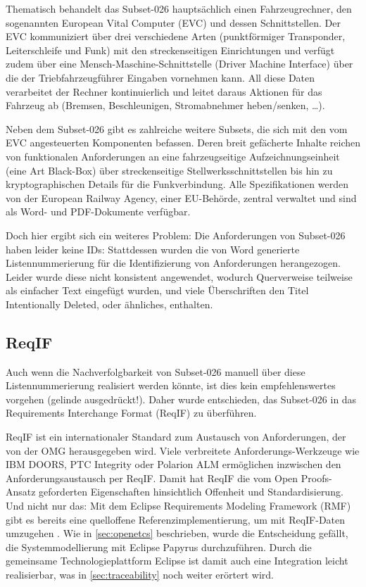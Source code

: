 \documentclass[twoside]{article}
\begin{document}
\begin{multicols}{2}
Thematisch behandelt das Subset-026 hauptsächlich einen Fahrzeugrechner, den sogenannten European Vital Computer (EVC) und dessen Schnittstellen. Der EVC kommuniziert über drei verschiedene Arten (punktförmiger Transponder, Leiterschleife und Funk) mit den streckenseitigen Einrichtungen und verfügt zudem über eine Mensch-Maschine-Schnittstelle (Driver Machine Interface) über die der Triebfahrzeugführer Eingaben vornehmen kann. All diese Daten verarbeitet der Rechner kontinuierlich und leitet daraus Aktionen für das Fahrzeug ab (Bremsen, Beschleunigen, Stromabnehmer heben/senken, \ldots ).

Neben dem Subset-026 gibt es zahlreiche weitere Subsets, die sich mit den vom EVC angesteuerten Komponenten befassen. Deren breit gefächerte Inhalte reichen von funktionalen Anforderungen an eine fahrzeugseitige Aufzeichnungseinheit (eine Art \glqq{}Black-Box\grqq{}) über streckenseitige Stellwerksschnittstellen bis hin zu kryptographischen Details für die Funkverbindung. Alle Spezifikationen werden von der European Railway Agency, einer EU-Behörde, zentral verwaltet und sind als Word- und PDF-Dokumente verfügbar.

Doch hier ergibt sich ein weiteres Problem: Die Anforderungen von Subset-026 haben leider keine IDs: Stattdessen wurden die von Word generierte Listennummerierung für die Identifizierung von Anforderungen herangezogen. Leider wurde diese nicht konsistent angewendet, wodurch Querverweise teilweise als einfacher Text eingefügt wurden, und viele Überschriften den Titel \glqq{}Intentionally Deleted\grqq{}, oder ähnliches, enthalten.

\subsection{ReqIF}

Auch wenn die Nachverfolgbarkeit von Subset-026 manuell über diese Listennummerierung realisiert werden könnte, ist dies kein empfehlenswertes vorgehen (gelinde ausgedrückt!).  Daher wurde entschieden, das Subset-026 in das Requirements Interchange Format (ReqIF) zu überführen. 

ReqIF \cite{openup} ist ein internationaler Standard zum Austausch von Anforderungen, der von der OMG herausgegeben wird.  Viele verbreitete Anforderungs-Werkzeuge wie IBM DOORS, PTC Integrity oder Polarion ALM ermöglichen inzwischen den Anforderungsaustausch per ReqIF.  Damit hat ReqIF die vom Open Proofs-Ansatz geforderten Eigenschaften hinsichtlich Offenheit und Standardisierung.  Und nicht nur das: Mit dem Eclipse Requirements Modeling Framework (RMF) gibt es bereits eine quelloffene Referenzimplementierung, um mit ReqIF-Daten umzugehen \cite{reqcycle}. Wie in \ref{sec:openetcs} beschrieben, wurde die Entscheidung gefällt, die Systemmodellierung mit Eclipse Papyrus durchzuführen.  Durch die gemeinsame Technologieplattform Eclipse ist damit auch eine Integration leicht realisierbar, was in \ref{sec:traceability} noch weiter erörtert wird.


\end{multicols}
\end{document}
